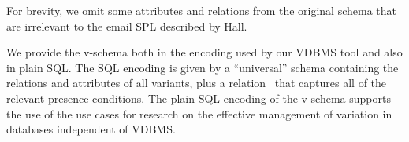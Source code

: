 %
For brevity, we omit some attributes and relations from the original schema
that are irrelevant to the email SPL described by Hall.
%


%
We provide the v-schema both in the encoding used by our VDBMS tool and also
in plain SQL.
%
The SQL encoding is given by a ``universal'' schema containing the relations and
attributes of all variants, plus a relation
\vdbpc\ that captures all of the relevant presence conditions.
%
%
The plain SQL encoding of the v-schema supports the use
of the use cases for research on the effective management of variation in
databases independent of VDBMS.

